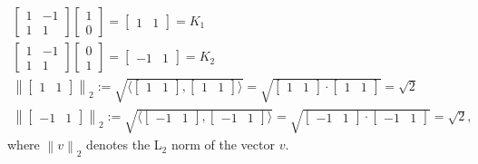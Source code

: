 \begin{equation*}
  \begin{array}{l}
    \begin{bmatrix}
      1 & -1 \\
      1 & 1
    \end{bmatrix}
    \begin{bmatrix}
      1 \\
      0
    \end{bmatrix}
    =
    \begin{bmatrix}
      1 & 1
    \end{bmatrix} = K_1
    \\
    \begin{bmatrix}
      1 & -1 \\
      1 & 1
    \end{bmatrix}
    \begin{bmatrix}
      0 \\
      1
    \end{bmatrix}
    =
    \begin{bmatrix}
      -1 & 1
    \end{bmatrix} = K_2
    \\
    \left\| \begin{bmatrix}1 & 1\end{bmatrix} \right\|_2 := \sqrt{\langle \begin{bmatrix}1 & 1\end{bmatrix}, \begin{bmatrix}1 & 1\end{bmatrix} \rangle} = \sqrt{\begin{bmatrix}1 & 1\end{bmatrix}\cdot \begin{bmatrix}1 & 1\end{bmatrix}} = \sqrt{2}\\
    \left\| \begin{bmatrix}-1 & 1\end{bmatrix} \right\|_2 := \sqrt{\langle \begin{bmatrix}-1 & 1\end{bmatrix}, \begin{bmatrix}-1 & 1\end{bmatrix} \rangle} = \sqrt{\begin{bmatrix}-1 & 1\end{bmatrix}\cdot \begin{bmatrix}-1 & 1\end{bmatrix}} = \sqrt{2},
  \end{array}
\end{equation*}
where $\left\|v \right\|_2$ denotes the L$_2$ norm of the vector $v$.

